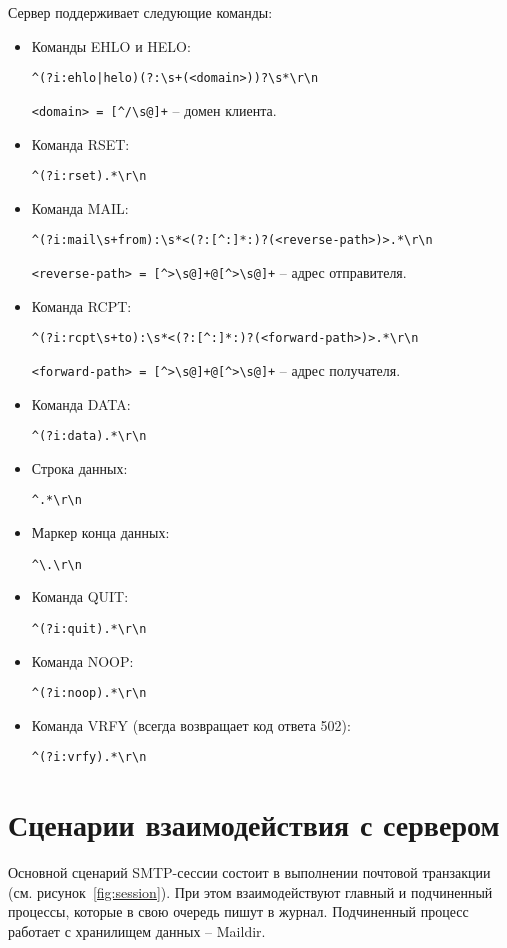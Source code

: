 Сервер поддерживает следующие команды:
\begin{itemize}
\item Команды EHLO и HELO:

\verb;^(?i:ehlo|helo)(?:\s+(<domain>))?\s*\r\n;

\verb;<domain> = [^/\s@]+; -- домен клиента.

\item Команда RSET:

\verb;^(?i:rset).*\r\n;

\item Команда MAIL:

\verb;^(?i:mail\s+from):\s*<(?:[^:]*:)?(<reverse-path>)>.*\r\n;

\verb;<reverse-path> = [^>\s@]+@[^>\s@]+; -- адрес отправителя.

\item Команда RCPT:

\verb;^(?i:rcpt\s+to):\s*<(?:[^:]*:)?(<forward-path>)>.*\r\n;

\verb;<forward-path> = [^>\s@]+@[^>\s@]+; -- адрес получателя.

\item Команда DATA:

\verb;^(?i:data).*\r\n;

\item Строка данных:

\verb;^.*\r\n;

\item Маркер конца данных:

\verb;^\.\r\n;

\item Команда QUIT:

\verb;^(?i:quit).*\r\n;

\item Команда NOOP:

\verb;^(?i:noop).*\r\n;

\item Команда VRFY (всегда возвращает код ответа 502):

\verb;^(?i:vrfy).*\r\n;

\end{itemize}

\section{Сценарии взаимодействия с сервером}

Основной сценарий SMTP-сессии состоит в выполнении почтовой транзакции (см. рисунок~\ref{fig:session}).
При этом взаимодействуют главный и подчиненный процессы, которые в свою очередь пишут в журнал.
Подчиненный процесс работает с хранилищем данных -- Maildir.

